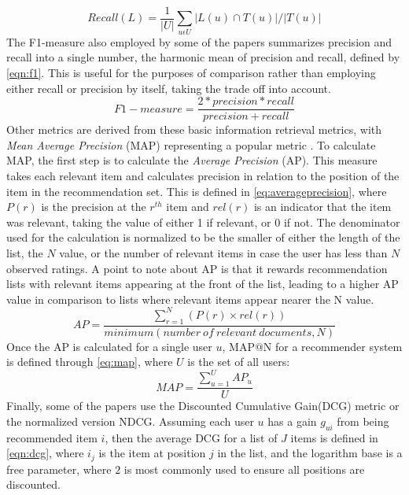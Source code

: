 \begin{equation}
    \label{eqn:recall}
    Recall(L) = \frac{1}{|U|} \sum\limits_{u \epsilon U} |L(u) \cap T(u)| / |T(u)|
\end{equation}
The F1-measure also employed by some of the papers summarizes precision and recall into a single number, the harmonic mean of precision and recall, defined by \autoref{eqn:f1}.
This is useful for the purposes of comparison rather than employing either recall or precision by itself, taking the trade off into account.
\begin{equation}
    \label{eqn:f1}
    F1-measure = \frac{2*precision*recall}{precision+recall}
\end{equation}
Other metrics are derived from these basic information retrieval metrics, with \textit{Mean Average Precision} (MAP) representing a popular metric \cite{ChoosingMetricsEvaluation}.
To calculate MAP, the first step is to calculate the \textit{Average Precision} (AP).
This measure takes each relevant item and calculates precision in relation to the position of the item in the recommendation set.
This is defined in \autoref{eq:averageprecision}, where $P(r)$ is the precision at the $r^{th}$ item and $rel(r)$ is an indicator that the item was relevant, taking the value of either 1 if relevant, or 0 if not.
The denominator used for the calculation is normalized to be the smaller of either the length of the list, the $N$ value, or the number of relevant items in case the user has less than $N$ observed ratings.
A point to note about AP is that it rewards recommendation lists with relevant items appearing at the front of the list, leading to a higher AP value in comparison to lists where relevant items appear nearer the N value. 
\begin{equation}
    \label{eq:averageprecision}
    AP = \frac{\sum\limits_{r=1}^N (P(r) \times rel(r))}{minimum(number \: of \: relevant \: documents, N)}
\end{equation}
Once the AP is calculated for a single user $u$, MAP@N for a recommender system is defined through \autoref{eq:map}, where $U$ is the set of all users: 
\begin{equation}
    \label{eq:map}
    MAP = \frac{\sum\limits_{u=1}^U AP_u}{U}
\end{equation}
Finally, some of the papers use the Discounted Cumulative Gain(DCG) metric or the normalized version NDCG.
Assuming each user $u$ has a gain $g_{ui}$ from being recommended item $i$, then the average DCG for a list of $J$ items is defined in \autoref{eqn:dcg}, where $i_j$ is the item at position $j$ in the list, and the logarithm base is a free parameter, where $2$ is most commonly used to ensure all positions are discounted.

